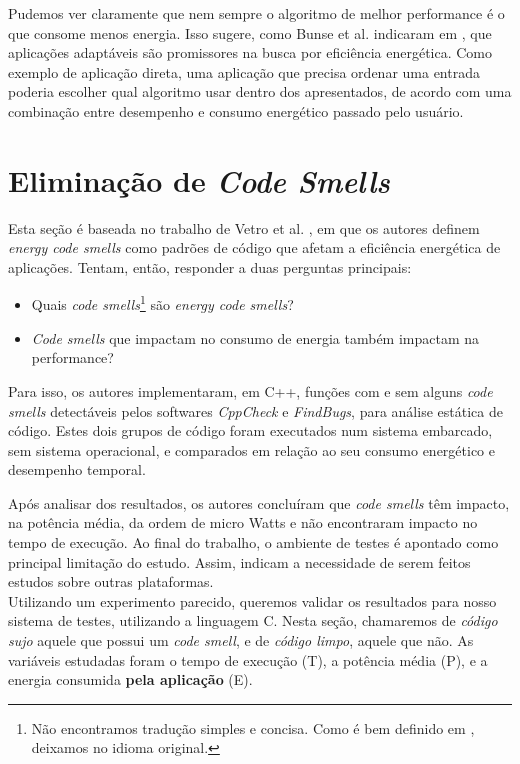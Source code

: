 Pudemos ver claramente que nem sempre o algoritmo de melhor performance é o que consome menos energia. Isso sugere, como Bunse et al. indicaram em  \cite{bunse2009exploring}, que aplicações adaptáveis são promissores na busca por eficiência energética. Como exemplo de aplicação direta, uma aplicação que precisa ordenar uma entrada poderia escolher qual algoritmo usar dentro dos apresentados, de acordo com uma combinação entre desempenho e consumo energético passado pelo usuário.


\section{Eliminação de \emph{Code Smells}}
Esta seção é baseada no trabalho de Vetro et al. \cite{vetro2013definition}, em que os autores definem \emph{energy code smells} como padrões de código que afetam a eficiência energética de aplicações. Tentam, então, responder a duas perguntas principais:
\begin{itemize}
\item Quais \emph{code smells}\footnote{Não encontramos tradução simples e concisa. Como é bem definido em \cite{fowler1997refactoring}, deixamos no idioma original.} são \emph{energy code smells}?
\item \emph{Code smells} que impactam no consumo de energia também impactam na performance?
\end{itemize}

Para isso, os autores implementaram, em C++, funções com e sem alguns \emph{code smells} detectáveis pelos softwares \emph{CppCheck} e \emph{FindBugs}, para análise estática de código. Estes dois grupos de código foram executados num sistema embarcado, sem sistema operacional, e comparados em relação ao seu consumo energético e desempenho temporal.

Após analisar dos resultados, os autores concluíram que \emph{code smells} têm impacto, na potência média, da ordem de micro Watts e não encontraram impacto no tempo de execução. Ao final do trabalho, o ambiente de testes é apontado como principal limitação do estudo. Assim, indicam a necessidade de serem feitos estudos sobre outras plataformas. \\

Utilizando um experimento parecido, queremos validar os resultados para nosso sistema de testes, utilizando a linguagem C. Nesta seção, chamaremos de \emph{código sujo} aquele que possui um \emph{code smell}, e de \emph{código limpo}, aquele que não. As variáveis estudadas foram o tempo de execução (T), a potência média (P), e a energia consumida \textbf{pela aplicação} (E).\\

